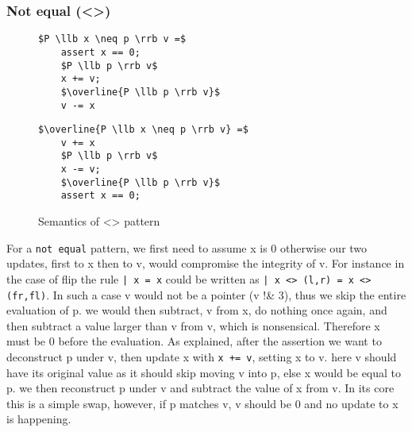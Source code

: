 \documentclass[a4paper]{article}
\begin{document}
\subsubsection{Not equal (<>)}
\label{sec:orgce7aec1}
\begin{figure}[!htb]
\begin{minipage}{0.4\textwidth}
\begin{lstlisting}
$P \llb x \neq p \rrb v =$
    assert x == 0;
    $P \llb p \rrb v$
    x += v;
    $\overline{P \llb p \rrb v}$
    v -= x
\end{lstlisting}
\end{minipage}
\qquad
\begin{minipage}{0.4\textwidth}
\begin{lstlisting}
$\overline{P \llb x \neq p \rrb v} =$
    v += x
    $P \llb p \rrb v$
    x -= v;
    $\overline{P \llb p \rrb v}$
    assert x == 0;
\end{lstlisting}
\end{minipage}

\caption{Semantics of <> pattern}
\label{Neq}
\end{figure}

For a \texttt{not equal} pattern, we first need to assume x is 0 otherwise our two updates, first to x then to v, would compromise the integrity of v. For instance in the case of flip the rule \texttt{| x = x} could be written as \texttt{| x <> (l,r) = x <> (fr,fl)}. In such a case v would not be a pointer (v !\& 3), thus we skip the entire evaluation of p. we would then subtract, v from x, do nothing once again, and then subtract a value larger than v from v, which is nonsensical. Therefore x must be 0 before the evaluation. As explained, after the assertion we want to deconstruct p under v, then update x with \texttt{x += v}, setting x to v. here v should have its original value as it should skip moving v into p, else x would be equal to p. we then reconstruct p under v and subtract the value of x from v. In its core this is a simple swap, however, if p matches v, v should be 0 and no update to x is happening.
\end{document}

